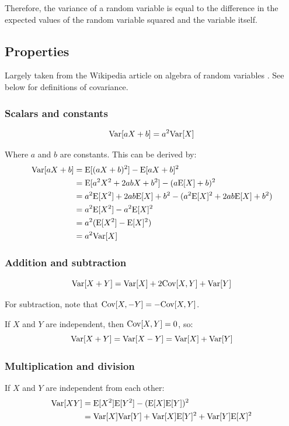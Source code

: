\documentclass[12pt]{article}
\begin{document}
Therefore, the variance of a random variable is equal to the difference in the expected values of the random variable squared and the variable itself.

\subsection{Properties}

Largely taken from the Wikipedia article on algebra of random variables \citep{wikipedia2026webAlgebraRandomVariables}. See below for definitions of covariance.

\subsubsection{Scalars and constants}
$$ \mathrm{Var}[aX + b] = a^2 \mathrm{Var}[X] $$
    
Where $a$ and $b$ are constants.
This can be derived by:
\begin{align*}
    \mathrm{Var}[aX + b] &= \mathrm{E}[(aX + b)^2] - \mathrm{E}[aX + b]^2 \\
    &= \mathrm{E}[a^2 X^2 + 2ab X + b^2] - (a \mathrm{E}[X] + b)^2 \\
    &= a^2 \mathrm{E}[X^2] + 2ab \mathrm{E}[X] + b^2 - (a^2 \mathrm{E}[X]^2 + 2ab \mathrm{E}[X] + b^2) \\
    &= a^2 \mathrm{E}[X^2] - a^2 \mathrm{E}[X]^2 \\
    &= a^2 (\mathrm{E}[X^2] - \mathrm{E}[X]^2) \\
    &= a^2 \mathrm{Var}[X]
\end{align*}

\subsubsection{Addition and subtraction}
$$ \mathrm{Var}[X + Y] = \mathrm{Var}[X] + 2 \mathrm{Cov}[X,Y] + \mathrm{Var}[Y] $$

For subtraction, note that $\mathrm{Cov}[X,-Y] = - \mathrm{Cov}[X,Y]$.

If $X$ and $Y$ are independent, then $\mathrm{Cov}[X,Y]=0$, so:
$$ \mathrm{Var}[X + Y] = \mathrm{Var}[X - Y] = \mathrm{Var}[X] + \mathrm{Var}[Y] $$

\subsubsection{Multiplication and division}
If $X$ and $Y$ are independent from each other:
\begin{align*}
    \mathrm{Var}[X Y] &= \mathrm{E}[X^2] \mathrm{E}[Y^2] - (\mathrm{E}[X] \mathrm{E}[Y])^2 \\
    &= \mathrm{Var}[X] \mathrm{Var}[Y] + \mathrm{Var}[X] \mathrm{E}[Y]^2 + \mathrm{Var}[Y] \mathrm{E}[X]^2
\end{align*}
\end{document}
